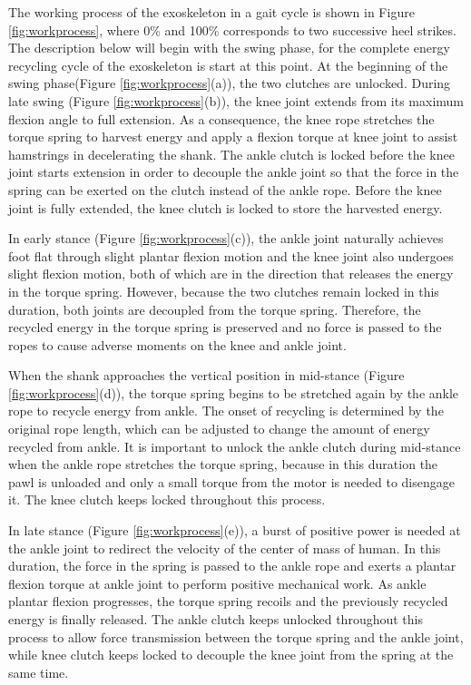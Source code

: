 \documentclass[twocolumn,cleanfoot,10pt]{asme2ej}
\begin{document}
The working process of the exoskeleton in a gait cycle is shown in Figure \ref{fig:workprocess}, where 0\% and 100\% corresponds to two successive heel strikes.
The description below will begin with the swing phase, for the complete energy recycling cycle of the exoskeleton is start at this point.
At the beginning of the swing phase(Figure \ref{fig:workprocess}(a)), the two clutches are unlocked.
During late swing (Figure \ref{fig:workprocess}(b)), the knee joint extends from its maximum flexion angle to full extension.
As a consequence, the knee rope stretches the torque spring to harvest energy and apply a flexion torque at knee joint to assist hamstrings in decelerating the shank.
The ankle clutch is locked before the knee joint starts extension in order to decouple the ankle joint so that the force in the spring can be exerted on the clutch instead of the ankle rope.
Before the knee joint is fully extended, the knee clutch is locked to store the harvested energy.

In early stance (Figure \ref{fig:workprocess}(c)), the ankle joint naturally achieves foot flat through slight plantar flexion motion and the knee joint also undergoes slight flexion motion, both of which are in the direction that releases the energy in the torque spring.
However, because the two clutches remain locked in this duration, both joints are decoupled from the torque spring.
Therefore, the recycled energy in the torque spring is preserved and no force is passed to the ropes to cause adverse moments on the knee and ankle joint.

When the shank approaches the vertical position in mid-stance (Figure \ref{fig:workprocess}(d)), the torque spring begins to be stretched again by the ankle rope to recycle energy from ankle.
The onset of recycling is determined by the original rope length, which can be adjusted to change the amount of energy recycled from ankle.
It is important to unlock the ankle clutch during mid-stance when the ankle rope stretches the torque spring, because in this duration the pawl is unloaded and only a small torque from the motor is needed to disengage it.
The knee clutch keeps locked throughout this process.

In late stance (Figure \ref{fig:workprocess}(e)), a burst of positive power is needed at the ankle joint to redirect the velocity of the center of mass of human.
In this duration, the force in the spring is passed to the ankle rope and exerts a plantar flexion torque at ankle joint to perform positive mechanical work.
As ankle plantar flexion progresses, the torque spring recoils and the previously recycled energy is finally released.
The ankle clutch keeps unlocked throughout this process to allow force transmission between the torque spring and the ankle joint, while knee clutch keeps locked to decouple the knee joint from the spring at the same time.
\end{document}
